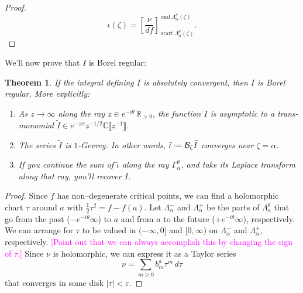 \documentclass{article}
\newcommand{\R}{\mathbb{R}}
\newcommand{\C}{\mathbb{C}}
\newcommand*{\defeq}{\mathrel{\vcenter{\baselineskip0.5ex \lineskiplimit0pt
                     \hbox{\scriptsize.}\hbox{\scriptsize.}}}%
                     =}
\newcommand{\borel}{\mathcal{B}}
\theoremstyle{definition}
\theoremstyle{plain}
\newtheorem{theorem}{Theorem}[section]
\begin{document}
{\begin{proof}
\begin{equation}
{\iota}(\zeta) = \left[\frac{\nu}{df}\right]_{\operatorname{start} \Lambda_\alpha^\theta(\zeta)}^{\operatorname{end} \Lambda_\alpha^\theta(\zeta)}.
\end{equation}
\end{proof}
We'll now prove that $I$ is Borel regular:
\begin{theorem}\label{thm:maxim-proof}
If the integral defining $I$ is absolutely convergent, then $I$ is Borel regular. More explicitly: 
\begin{enumerate}
\item\label{part-1} As $z \to \infty$ along the ray $z \in e^{-i\theta}\,\R_{>0}$, the function $I$ is asymptotic to a trans-monomial $\tilde{I}\in e^{-z \alpha} z^{-1/2} \C\llbracket z^{-1}\rrbracket$.
\item\label{part-2} The series $\tilde{I}$ is $1$-Gevrey. In other words, $\tilde{\iota} \defeq \borel_\zeta \tilde{I}$ converges near $\zeta=\alpha$.
\item\label{part-3} If you continue the sum of $\tilde{\iota}$ along the ray $\Gamma_\alpha^\theta$, and take its Laplace transform along that ray, you'll recover $I$.
\end{enumerate}
\end{theorem}
\begin{proof}
Since $f$ has non--degenerate critical points, we can find a holomorphic chart $\tau$ around $a$ with $\tfrac{1}{2} \tau^2 = f - f(a)$. Let $\Lambda^-_\alpha$ and $\Lambda^+_\alpha$ be the parts of $\Lambda_a^\theta$ that go from the past ($-e^{-i\theta}\infty$) to $a$ and from $a$ to the future ($+e^{-i\theta}\infty$), respectively. We can arrange for $\tau$ to be valued in $(-\infty, 0]$ and $[0,\infty)$ on $\Lambda^-_\alpha$ and $\Lambda^+_\alpha$, respectively. \textcolor{magenta}{[Point out that we can always accomplish this by changing the sign of $\tau$.]} Since $\nu$ is holomorphic, we can express it as a Taylor series
\[ \nu = \sum_{m \ge 0} b_m^a \tau^m\,d\tau \]
that converges in some disk $|\tau| < \varepsilon$.


\end{proof}}
\end{document}
